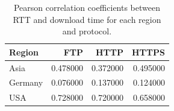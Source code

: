 \begin{table}
\caption{Pearson correlation coefficients between RTT and download time for each region and protocol.}
\label{tab:grouped_corr}
\begin{tabular}{lrrr}
\toprule
Region & FTP & HTTP & HTTPS \\
\midrule
Asia & 0.478000 & 0.372000 & 0.495000 \\
Germany & 0.076000 & 0.137000 & 0.124000 \\
USA & 0.728000 & 0.720000 & 0.658000 \\
\bottomrule
\end{tabular}
\end{table}
